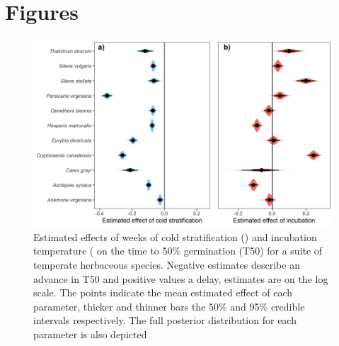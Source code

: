 \documentclass{article}\usepackage[]{graphicx}\usepackage[]{color}
\begin{document}
\section*{Figures}
\begin{figure}[h!]
    \centering
\includegraphics[width=\textwidth]{..//figure/mus_survival.jpeg}
   \caption{Estimated effects of weeks of cold stratification () and incubation temperature ( on the time to 50\% germination (T50) for a suite of temperate herbaceous species. Negative estimates describe an advance in T50 and positive values a delay, estimates are on the log scale. The points indicate the mean estimated effect of each parameter, thicker  and thinner bars the 50\% and 95\% credible intervals respectively. The full posterior distribution for each parameter is also depicted  } 
   \label{fig:musurv}
\end{figure}
\end{document}
